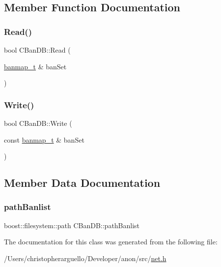 \subsection{Member Function Documentation}
\mbox{\label{class_c_ban_d_b_aa3bb0e398409c933bf79a9af56c807f2}} 
\subsubsection{\texorpdfstring{Read()}{Read()}}
{\footnotesize\ttfamily bool C\+Ban\+D\+B\+::\+Read (\begin{DoxyParamCaption}\item[{\mbox{\hyperlink{net_8h_af9675d81650e48d20ae495adf73da102}{banmap\+\_\+t}} \&}]{ban\+Set }\end{DoxyParamCaption})}

\mbox{\label{class_c_ban_d_b_a0550a06c6b5987869f557467fe7f9896}} 
\subsubsection{\texorpdfstring{Write()}{Write()}}
{\footnotesize\ttfamily bool C\+Ban\+D\+B\+::\+Write (\begin{DoxyParamCaption}\item[{const \mbox{\hyperlink{net_8h_af9675d81650e48d20ae495adf73da102}{banmap\+\_\+t}} \&}]{ban\+Set }\end{DoxyParamCaption})}



\subsection{Member Data Documentation}
\mbox{\label{class_c_ban_d_b_a0e1a5a91308ec65cbbff8e3f5dd98431}} 
\subsubsection{\texorpdfstring{path\+Banlist}{pathBanlist}}
{\footnotesize\ttfamily boost\+::filesystem\+::path C\+Ban\+D\+B\+::path\+Banlist\hspace{0.3cm}{\ttfamily [private]}}



The documentation for this class was generated from the following file\+:\begin{DoxyCompactItemize}
\item 
/\+Users/christopherarguello/\+Developer/anon/src/\mbox{\hyperlink{net_8h}{net.\+h}}\end{DoxyCompactItemize}
